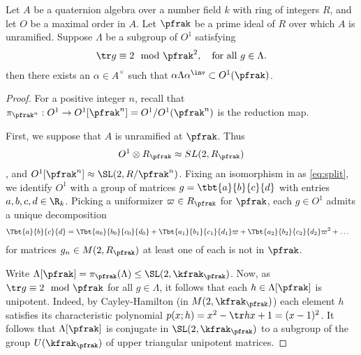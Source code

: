 \begin{lemma}\label{lemma:MangosteenPicosdeEuropa}
	Let $A$ be a quaternion algebra over a number field $k$ with ring of integers $R$, and let $O$ be a maximal order in $A$.
	Let $\pfrak$ be a prime ideal of $R$ over which $A$ is unramified.
	Suppose $\Lambda$ be a subgroup of $O^1$ satisfying
	\begin{align}\label{eq:trace}
		\tr g \equiv 2 \mod \pfrak^2, \quad \text{for all $g \in \Lambda$}.
	\end{align}
	then there exists an $\alpha \in A^\times$ such that $\alpha \Lambda \alpha^\inv \subset O^1(\pfrak)$.
\end{lemma}
\begin{proof}
	For a positive integer $n$, recall that $\pi_{\pfrak^n}: O^1 \to O^1[\pfrak^n]=O^1/O^1(\pfrak^n)$ is the reduction map.


	First, we suppose that $A$ is unramified at $\pfrak$.
	Thus
	\begin{align}\label{eq:split}
		O^1 \otimes R_\pfrak \approx SL(2,R_\pfrak)
	\end{align}, and $O^1[\pfrak^n] \approx \SL(2,R/\pfrak^n)$. Fixing an isomorphism in as \ref{eq:split}, we identify $O^1$ with a group of matrices $g = \tbt{a}{b}{c}{d}$ with entries $a,b,c,d \in \R_k$. Picking a uniformizer $\varpi \in R_\pfrak$ for $\pfrak$, each $g\in O^1$ admits a unique decomposition
	\begin{align}\label{eq:decomposition}
		\Tbt{a}{b}{c}{d} & =  \Tbt{a_0}{b_0}{c_0}{d_0} +\Tbt{a_1}{b_1}{c_1}{d_1} \varpi + \Tbt{a_2}{b_2}{c_2}{d_2} \varpi^2 + \dots
	\end{align}
	for matrices $g_n \in M(2,R_\pfrak)$ at least one of each is not in $\pfrak$.


	Write $\Lambda[\pfrak] = \pi_{\pfrak}(\Lambda)\leq \SL(2,\kfrak_\pfrak)$. Now, as $\tr g \equiv 2 \mod \pfrak$ for all $g \in \Lambda$, it follows that each $h \in \Lambda[\pfrak]$ is unipotent.
	Indeed, by Cayley-Hamilton (in $M(2,\kfrak_\pfrak)$) each element $h$ satisfies its characteristic polynomial $p(x;h)=x^2 - \tr h x + 1= (x-1)^2$.
	It follows that $\Lambda[\pfrak]$ is conjugate in $\SL(2,\kfrak_\pfrak)$ to a subgroup of the group $U(\kfrak_\pfrak)$ of upper triangular unipotent matrices.


\end{proof}
